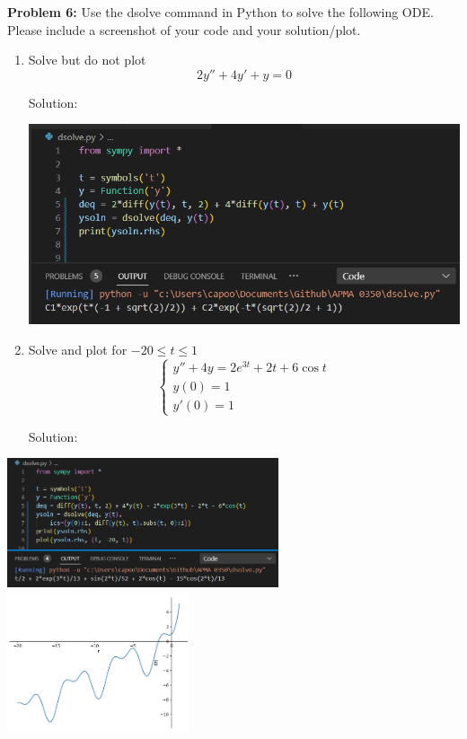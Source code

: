 \documentclass[12pt]{article}
\begin{document}
\textbf{Problem 6:} Use the dsolve command in Python to solve the following ODE. Please
include a screenshot of your code and your solution/plot.
\begin{enumerate}
    \item Solve but do not plot
    \[2y'' + 4y' + y = 0\]

    Solution:

    \includegraphics{Images/5a code.png}

    \item Solve and plot for $-20 \leq t \leq 1$
    \[\begin{cases}
        y'' + 4y = 2e^{3t} + 2t + 6\cos t\\
        y(0) = 1\\
        y'(0) = 1
    \end{cases}\]

    Solution:
\end{enumerate}

\includegraphics[width=0.6\textwidth]{Images/5b code.png}
\includegraphics[width=0.4\textwidth]{Images/5b plot.png}
\end{document}
